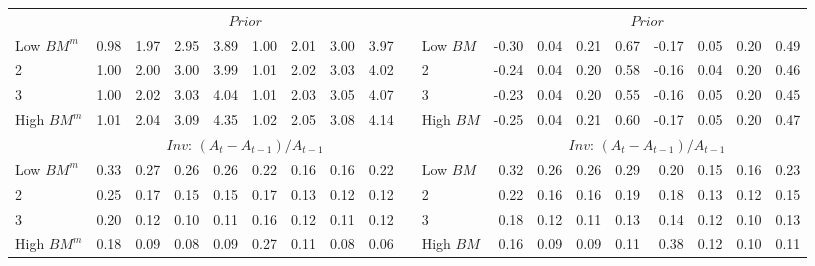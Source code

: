 \begin{table}[ht]
\begin{tabular}{lrrrrrrrrllrrrrrrrr}
                 & \multicolumn{8}{c}{$Prior$}                                           & &             & \multicolumn{8}{c}{$Prior$} \\
    Low $BM^m$   &  0.98  &  1.97  &  2.95  &  3.89  &  1.00  &  2.01  &  3.00  &  3.97  & &  Low $BM$   & -0.30  &  0.04  &  0.21  &  0.67  & -0.17  &  0.05  &  0.20  &  0.49  \\
             2   &  1.00  &  2.00  &  3.00  &  3.99  &  1.01  &  2.02  &  3.03  &  4.02  & &         2   & -0.24  &  0.04  &  0.20  &  0.58  & -0.16  &  0.04  &  0.20  &  0.46  \\
             3   &  1.00  &  2.02  &  3.03  &  4.04  &  1.01  &  2.03  &  3.05  &  4.07  & &         3   & -0.23  &  0.04  &  0.20  &  0.55  & -0.16  &  0.05  &  0.20  &  0.45  \\
    High $BM^m$  &  1.01  &  2.04  &  3.09  &  4.35  &  1.02  &  2.05  &  3.08  &  4.14  & &  High $BM$  & -0.25  &  0.04  &  0.21  &  0.60  & -0.17  &  0.05  &  0.20  &  0.47  \\
    [1em]
  

                 & \multicolumn{8}{c}{$Inv$: $(A_t - A_{t-1}) / A_{t-1}$}                & &             & \multicolumn{8}{c}{$Inv$: $(A_t - A_{t-1}) / A_{t-1}$} \\
    Low $BM^m$   &  0.33  &  0.27  &  0.26  &  0.26  &  0.22  &  0.16  &  0.16  &  0.22  & &  Low $BM$   &  0.32  &  0.26  &  0.26  &  0.29  &  0.20  &  0.15  &  0.16  &  0.23  \\
             2   &  0.25  &  0.17  &  0.15  &  0.15  &  0.17  &  0.13  &  0.12  &  0.12  & &         2   &  0.22  &  0.16  &  0.16  &  0.19  &  0.18  &  0.13  &  0.12  &  0.15  \\
             3   &  0.20  &  0.12  &  0.10  &  0.11  &  0.16  &  0.12  &  0.11  &  0.12  & &         3   &  0.18  &  0.12  &  0.11  &  0.13  &  0.14  &  0.12  &  0.10  &  0.13  \\
    High $BM^m$  &  0.18  &  0.09  &  0.08  &  0.09  &  0.27  &  0.11  &  0.08  &  0.06  & &  High $BM$  &  0.16  &  0.09  &  0.09  &  0.11  &  0.38  &  0.12  &  0.10  &  0.11  \\
    [1em]
  


\end{tabular}
\end{table}
